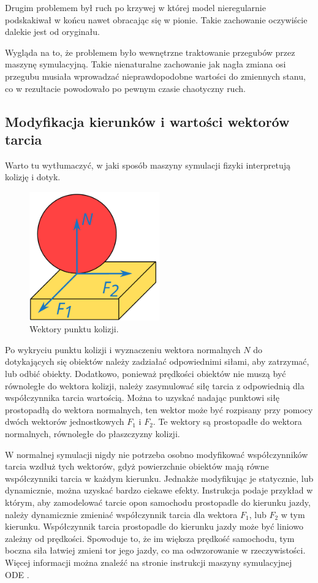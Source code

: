 		Drugim problemem był ruch po krzywej w której model nieregularnie podskakiwał w końcu nawet obracając się w pionie.
		Takie zachowanie oczywiście dalekie jest od oryginału.

		Wygląda na to, że problemem było wewnętrzne traktowanie przegubów przez maszynę symulacyjną.
		Takie nienaturalne zachowanie jak nagła zmiana osi przegubu musiała wprowadzać nieprawdopodobne wartości do zmiennych stanu, co w rezultacie powodowało po pewnym czasie chaotyczny ruch.

	\subsection{Modyfikacja kierunków i wartości wektorów tarcia}
		\label{sec:friction}
		Warto tu wytłumaczyć, w jaki sposób maszyny symulacji fizyki interpretują kolizję i dotyk.

		\begin{figure}[H]
		\centering
		\includegraphics[width=0.5\textwidth]{graphics/friction.pdf}
		\caption{Wektory punktu kolizji.}
		\end{figure} 

		Po wykryciu punktu kolizji i wyznaczeniu wektora normalnych $N$ do dotykających się obiektów należy zadziałać odpowiednimi siłami, aby zatrzymać, lub odbić obiekty.
		Dodatkowo, ponieważ prędkości obiektów nie muszą być równoległe do wektora kolizji, należy zasymulować siłę tarcia z odpowiednią dla współczynnika tarcia wartością.
		Można to uzyskać nadając punktowi siłę prostopadłą do wektora normalnych, ten wektor może być rozpisany przy pomocy dwóch wektorów jednostkowych $F_1$ i $F_2$. 
		Te wektory są prostopadłe do wektora normalnych, równoległe do płaszczyzny kolizji.

		W normalnej symulacji nigdy nie potrzeba osobno modyfikować współczynników tarcia wzdłuż tych wektorów, gdyż powierzchnie obiektów mają równe współczynniki tarcia w każdym kierunku.
		Jednakże modyfikując je statycznie, lub dynamicznie, można uzyskać bardzo ciekawe efekty.
		Instrukcja podaje przykład w którym, aby zamodelować tarcie opon samochodu prostopadle do kierunku jazdy, należy dynamicznie zmieniać współczynnik tarcia dla wektora $F_1$, lub $F_2$ w tym kierunku.
		Współczynnik tarcia prostopadle do kierunku jazdy może być liniowo zależny od prędkości.
		Spowoduje to, że im większa prędkość samochodu, tym boczna siła łatwiej zmieni tor jego jazdy, co ma odwzorowanie w rzeczywistości.
		Więcej informacji można znaleźć na stronie instrukcji maszyny symulacyjnej ODE \cite{ode_contact}.

